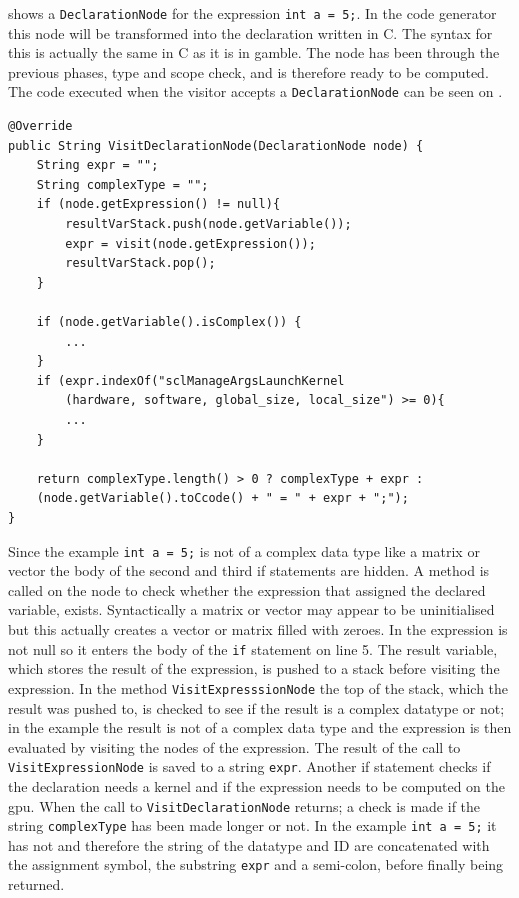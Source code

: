  shows a \texttt{DeclarationNode} for the expression \texttt{int a = 5;}. 
In the code generator this node will be transformed into the declaration written in C. 
The syntax for this is actually the same in C as it is in \gls{gamble}. 
The node has been through the previous phases, type and scope check, and is therefore ready to be computed.
The code executed when the visitor accepts a \texttt{DeclarationNode} can be seen on .
\begin{lstlisting}[float, floatplacement=H!, caption=The visit method for visitting a DeclarationNode in the codegenerator. ,frame=tlrb,label={lst:DeclarationNodeCodeGen}]
@Override
public String VisitDeclarationNode(DeclarationNode node) {
    String expr = "";
    String complexType = "";
    if (node.getExpression() != null){
        resultVarStack.push(node.getVariable());
        expr = visit(node.getExpression());
        resultVarStack.pop();
    }

    if (node.getVariable().isComplex()) {
        ...
    }
    if (expr.indexOf("sclManageArgsLaunchKernel
    	(hardware, software, global_size, local_size") >= 0){
        ...
    }
    
    return complexType.length() > 0 ? complexType + expr : 
    (node.getVariable().toCcode() + " = " + expr + ";");
}
\end{lstlisting}
Since the example \texttt{int a = 5;} is not of a complex data type like a matrix or vector the body of the second and third if statements are hidden.
A method is called on the node to check whether the expression that assigned the declared variable, exists. 
Syntactically a matrix or vector may appear to be uninitialised but this actually creates a vector or matrix filled with zeroes.
In  the expression is not null so it enters the body of the \texttt{if} statement on line 5.
The result variable, which stores the result of the expression, is pushed to a stack before visiting the expression.
In the method \texttt{VisitExpresssionNode} the top of the stack, which the result was pushed to, is checked to see if the result is a complex datatype or not; in the example the result is not of a complex data type and the expression is then evaluated by visiting the nodes of the expression.
The result of the call to \texttt{VisitExpressionNode} is saved to a string \texttt{expr}.
Another if statement checks if the declaration needs a kernel and if the expression needs to be computed on the \acrshort{gpu}.
When the call to \texttt{VisitDeclarationNode} returns; a check is made if the string \texttt{complexType} has been made longer or not.
In the example \texttt{int a = 5;} it has not and therefore the string of the datatype and ID are concatenated with the assignment symbol, the substring \texttt{expr} and a semi-colon, before finally being returned.



